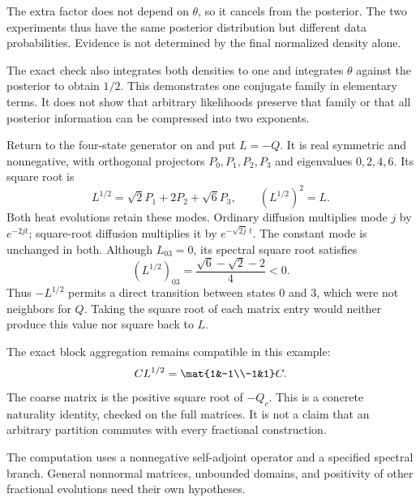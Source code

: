 The extra factor does not depend on $\theta$, so it cancels from the posterior. The two experiments thus have the same posterior distribution but different data probabilities. Evidence is not determined by the final normalized density alone.

The exact check also integrates both densities to one and integrates $\theta$ against the posterior to obtain $1/2$. This demonstrates one conjugate family in elementary terms. It does not show that arbitrary likelihoods preserve that family or that all posterior information can be compressed into two exponents.

Return to the four-state generator on  and put $L=-Q$. It is real symmetric and nonnegative, with orthogonal projectors $P_0,P_1,P_2,P_3$ and eigenvalues $0,2,4,6$. Its square root is
\[
L^{1/2}=\sqrt2P_1+2P_2+\sqrt6P_3,
\qquad (L^{1/2})^2=L.
\]
Both heat evolutions retain these modes. Ordinary diffusion multiplies mode $j$ by $e^{-2jt}$; square-root diffusion multiplies it by $e^{-\sqrt{2j}\,t}$. The constant mode is unchanged in both.
Although $L_{03}=0$, its spectral square root satisfies
\[
(L^{1/2})_{03}=\frac{\sqrt6-\sqrt2-2}{4}<0.
\]
Thus $-L^{1/2}$ permits a direct transition between states $0$ and $3$, which were not neighbors for $Q$. Taking the square root of each matrix entry would neither produce this value nor square back to $L$.

The exact block aggregation remains compatible in this example:
\[
C L^{1/2}=\mat{1&-1\\-1&1}C.
\]
The coarse matrix is the positive square root of $-Q_c$. This is a concrete naturality identity, checked on the full matrices. It is not a claim that an arbitrary partition commutes with every fractional construction.

The computation uses a nonnegative self-adjoint operator and a specified spectral branch. General nonnormal matrices, unbounded domains, and positivity of other fractional evolutions need their own hypotheses.

